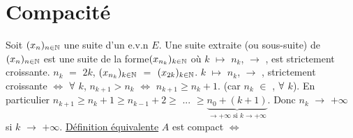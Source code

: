 \documentclass{article}
\begin{document}
\section{Compacité}
\parindent=0cm
Soit $(x_n)_{n \in \mathbb{N}}$ une suite d'un e.v.n $E$. Une suite extraite (ou sous-suite) de $(x_n)_{n \in \mathbb{N}}$ est une suite de la forme\s $(x_{n_k})_{k \in \mathbb{N}}$ où $k$ $\mapsto$ $n_k$, \Nn $\longrightarrow$ \NN, est strictement croissante.
\ex $n_k$ $=$ $2k$, $(x_{n_k})_{k \in \mathbb{N}}$ $=$ $(x_{2k})_{k \in \mathbb{N}}$.
\remarque
$k$ $\mapsto$ $n_k$, \Nn $\longrightarrow$ \NN, strictement croissante $\Longleftrightarrow$ $\forall$ $k$, $n_{k+1} > n_k$ $\Longleftrightarrow$ $n_{k+1} \geqslant n_k + 1$. (car $n_k$ $\in$ \NN, $\forall$ $k$). \s En particulier $n_{k+1} \geqslant n_k + 1 \geqslant n_{k-1}+2 \geqslant$ ... $\geqslant \underset{\rightarrow +\infty \text{ si } k \rightarrow +\infty}{\underbrace{n_0 + (k+1)}}$. Donc $n_k$ $\longrightarrow$ $+\infty$ si $k$ $\longrightarrow$ $+\infty$.
\parindent=0cm
\underline{Définition équivalente} \parindent=1cm \smallbreak
$A$ est compact $\Longleftrightarrow$
\end{document}
